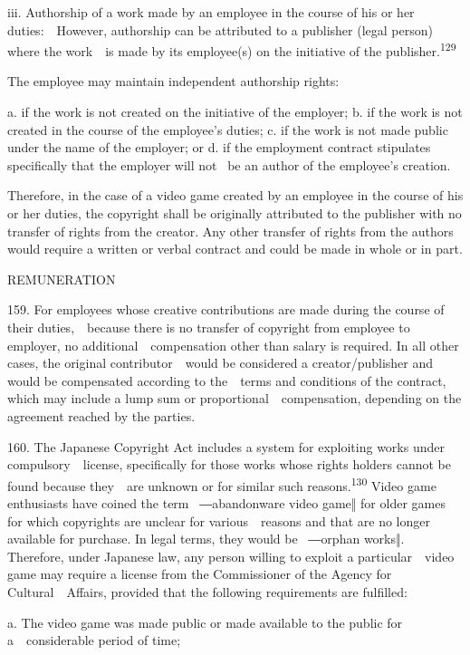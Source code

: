 \documentclass[
]{article}
\begin{document}
{iii. Authorship of a work made by an employee in the course of his or
her duties:~~However, authorship can be attributed to a publisher (legal
person) where the work~~is made by its employee(s) on the initiative of
the publisher.}\textsuperscript{{129}}

{The employee may maintain independent authorship rights:}

{a. if the work is not created on the initiative of the employer; b.
}{if the work is not created in the course of the employee's duties;
}{c. if the work is not made public under the name of the employer; or
d. if the employment contract stipulates specifically that the employer
will not }{~be an author of the employee's creation.}

{Therefore, in the case of a video game created by an employee in the
course of his or her duties, the copyright shall be originally
attributed to the publisher with no transfer of rights from the creator.
Any other transfer of rights from the authors would require a written or
verbal contract and could be made in whole or in part.}

{REMUNERATION}

{159. }{For employees whose creative contributions are made during the
course of their duties,~~because there is no transfer of copyright from
employee to employer, no additional~~compensation other than salary is
required. In all other cases, the original contributor~~would be
considered a creator/publisher and would be compensated according to
the~~terms and conditions of the contract, which may include a lump sum
or proportional~~compensation, depending on the agreement reached by the
parties.}

{160. }{The Japanese }{Copyright Act }{includes a system for exploiting
works under compulsory~~license, specifically for those works whose
rights holders cannot be found because they~~are unknown or for similar
such reasons.}\textsuperscript{{130 }}{Video game enthusiasts have
coined the term }{~―}{abandonware }{video game‖ }{for older games for
which copyrights are unclear for various~~reasons and that are no longer
available for purchase. In legal terms, they would be }{~―}{orphan
works‖}{. Therefore, under Japanese law, any person willing to exploit a
particular~~video game may require a license from the Commissioner of
the Agency for Cultural~~Affairs, provided that the following
requirements are fulfilled:}

{a. The video game was made public or made available to the public for
a~~considerable period of time;}
\end{document}
